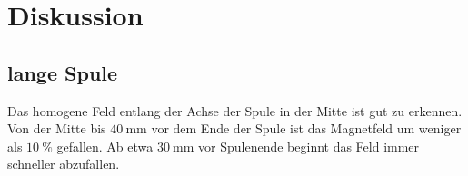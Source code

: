 \section{Diskussion}
\subsection{lange Spule}
Das homogene Feld entlang der Achse der Spule in der Mitte ist gut zu erkennen. Von der Mitte bis $ \SI{40}{\milli\meter} $ vor dem Ende der Spule ist das Magnetfeld um weniger als $ \SI{10}{\percent} $ gefallen. Ab etwa $ \SI{30}{\milli\meter} $ vor Spulenende beginnt das Feld immer schneller abzufallen. %
